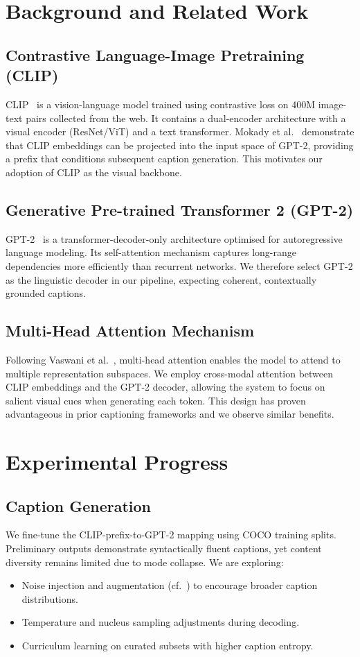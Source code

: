 \documentclass[10pt,twocolumn]{article}
\begin{document}
\section{Background and Related Work}
\subsection{Contrastive Language-Image Pretraining (CLIP)}
CLIP~\cite{mokady2021clipcap} is a vision-language model trained using contrastive loss on 400M image-text pairs collected from the web. It contains a dual-encoder architecture with a visual encoder (ResNet/ViT) and a text transformer. Mokady et al.~\cite{mokady2021clipcap} demonstrate that CLIP embeddings can be projected into the input space of GPT-2, providing a prefix that conditions subsequent caption generation. This motivates our adoption of CLIP as the visual backbone.

\subsection{Generative Pre-trained Transformer 2 (GPT-2)}
GPT-2~\cite{radford2019language} is a transformer-decoder-only architecture optimised for autoregressive language modeling. Its self-attention mechanism captures long-range dependencies more efficiently than recurrent networks. We therefore select GPT-2 as the linguistic decoder in our pipeline, expecting coherent, contextually grounded captions.

\subsection{Multi-Head Attention Mechanism}
Following Vaswani et al.~\cite{vaswani2017attention}, multi-head attention enables the model to attend to multiple representation subspaces. We employ cross-modal attention between CLIP embeddings and the GPT-2 decoder, allowing the system to focus on salient visual cues when generating each token. This design has proven advantageous in prior captioning frameworks and we observe similar benefits.

\section{Experimental Progress}
\subsection{Caption Generation}
We fine-tune the CLIP-prefix-to-GPT-2 mapping using COCO training splits. Preliminary outputs demonstrate syntactically fluent captions, yet content diversity remains limited due to mode collapse. We are exploring:
\begin{itemize}[leftmargin=1.5em]
    \item Noise injection and augmentation (cf.~\cite{nukrai2022text}) to encourage broader caption distributions.
    \item Temperature and nucleus sampling adjustments during decoding.
    \item Curriculum learning on curated subsets with higher caption entropy.
\end{itemize}
\end{document}

